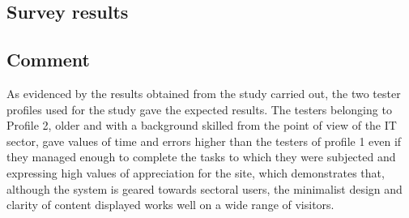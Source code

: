 \subsection{Survey results}
\begin{figure}[H]
  \centering
\end{figure}


\subsection{Comment}
As evidenced by the results obtained from the study carried out, the two tester profiles used for the study gave the expected results. The testers belonging to Profile 2, older and with a background skilled from the point of view of the IT sector, gave values of time and errors higher than the testers of profile 1 even if they managed enough to complete the tasks to which they were subjected and expressing high values of appreciation for the site, which demonstrates that, although the system is geared towards sectoral users, the minimalist design and clarity of content displayed works well on a wide range of visitors.



